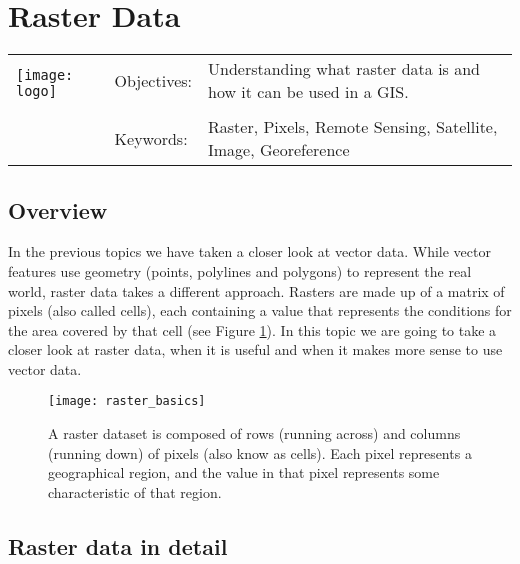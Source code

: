 

\section{Raster Data}\label{sec:rasterdata}
\begin{tabular}{p{3.5cm}p{6cm}p{6cm}}
\multirow{2}{*}{\texttt{[image: logo]}} & Objectives: &
Understanding what raster data is and how it can be used in a GIS. \\
& & \\
& Keywords: & 
Raster, Pixels, Remote Sensing, Satellite, Image, Georeference  \\
\hline
\end{tabular}

\subsection{Overview}\label{subsec:overview}

In the previous topics we have taken a closer look at vector data. While
vector features use geometry (points, polylines and polygons) to represent
the real world, raster data takes a different approach. Rasters are made up
of a matrix of pixels (also called cells), each containing a value that
represents the conditions  for the area covered by that cell (see
Figure \ref{fig:rastergrid}). In this topic we are going to take a closer
look at raster data, when it is useful and when it makes more sense to use
vector data.

\begin{figure}[ht]
   \begin{center}
   \caption{A raster dataset is composed of rows (running across) and columns
(running down) of pixels (also know as cells). Each pixel represents a
geographical region, and the value in that pixel represents some
characteristic of that region.}
\label{fig:rastergrid}\smallskip
   \texttt{[image: raster\_basics]}
\end{center}
\end{figure}

\subsection{Raster data in detail}

